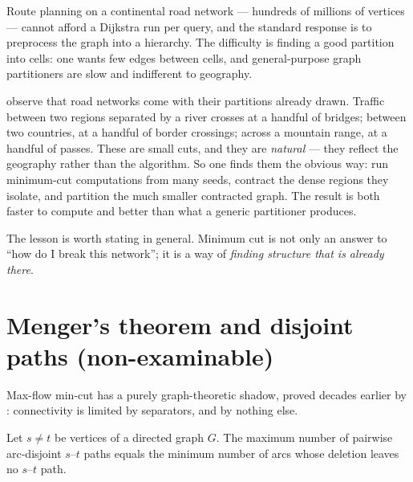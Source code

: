 Route planning on a continental road network --- hundreds of millions of
vertices --- cannot afford a Dijkstra run per query, and the standard response
is to preprocess the graph into a hierarchy. The difficulty is finding a good
partition into cells: one wants few edges between cells, and general-purpose
graph partitioners are slow and indifferent to geography.

\citet{DellingGoldbergRazenshteynWerneck2011} observe that road networks come
with their partitions already drawn. Traffic between two regions separated by a
river crosses at a handful of bridges; between two countries, at a handful of
border crossings; across a mountain range, at a handful of passes. These are
small cuts, and they are \emph{natural} --- they reflect the geography rather
than the algorithm. So one finds them the obvious way: run minimum-cut
computations from many seeds, contract the dense regions they isolate, and
partition the much smaller contracted graph. The result is both faster to
compute and better than what a generic partitioner produces.

The lesson is worth stating in general. Minimum cut is not only an answer to
``how do I break this network''; it is a way of \emph{finding structure that is
already there}.

\section{Menger's theorem and disjoint paths (non-examinable)}
\label{sec:flow-menger}


Max-flow min-cut has a purely graph-theoretic shadow, proved decades earlier by
\citet{Menger1927}: connectivity is limited by separators, and by nothing else.

\begin{theorem}\label{thm:flow-menger-edge}
Let $s \ne t$ be vertices of a directed graph $G$. The maximum number of
pairwise arc-disjoint $s$--$t$ paths equals the minimum number of arcs whose
deletion leaves no $s$--$t$ path.
\end{theorem}


